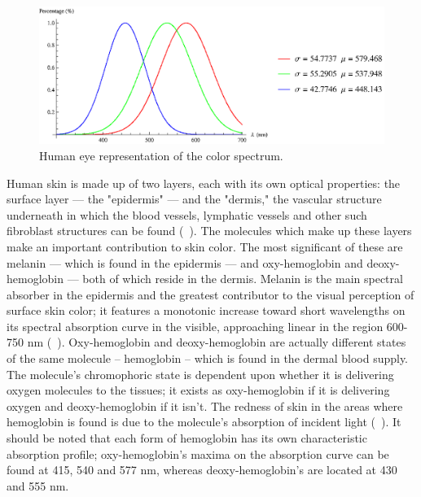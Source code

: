 \begin{figure}[h!]
  \caption{Human eye representation of the color spectrum.}\label{fig:spectrum}
  \centering
    \includegraphics[width=\textwidth]{Chapter2/Figs/spectrum.eps}
\end{figure}

Human skin is made up of two layers, each with its own optical properties: the surface layer --- the "epidermis" --- and the "dermis," the vascular structure underneath in which the blood vessels, lymphatic vessels and other such fibroblast structures can be found (~\cite{Stamatas2004}). The molecules which make up these layers make an important contribution to skin color. The most significant of these are melanin --- which is found in the epidermis --- and oxy-hemoglobin and deoxy-hemoglobin --- both of which reside in the dermis. Melanin is the main spectral absorber in the epidermis and the greatest contributor to the visual perception of surface skin color; it features a monotonic increase toward short wavelengths on its spectral absorption curve in the visible, approaching linear in the region 600-750 nm (~\cite{Stamatas2004,Kollias1995}). Oxy-hemoglobin and deoxy-hemoglobin are actually different states of the same molecule -- hemoglobin -- which is found in the dermal blood supply. The molecule's chromophoric state is dependent upon whether it is delivering oxygen molecules to the tissues; it exists as oxy-hemoglobin if it is delivering oxygen and deoxy-hemoglobin if it isn't. The redness of skin in the areas where hemoglobin is found is due to the molecule's absorption of incident light (~\cite{Kollias1995}). It should be noted that each form of hemoglobin has its own characteristic absorption profile; oxy-hemoglobin's maxima on the absorption curve can be found at 415, 540 and 577 nm, whereas deoxy-hemoglobin's are located at 430 and 555 nm.

